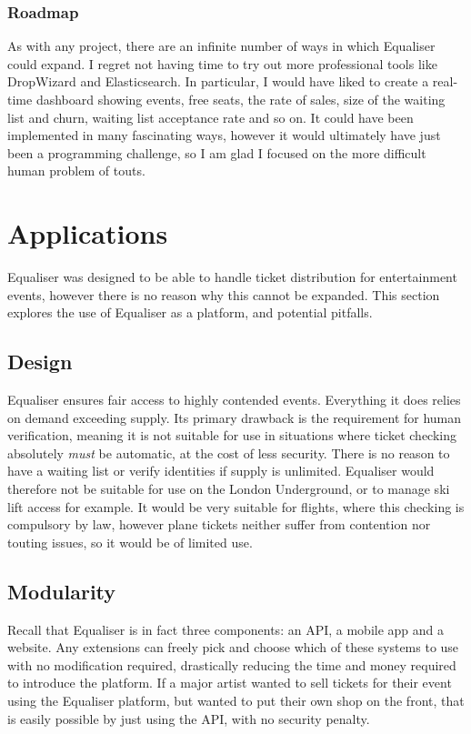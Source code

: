 \documentclass[12pt,a4paper]{bhamdissertation}
\begin{document}
\subsection{Roadmap}

As with any project, there are an infinite number of ways in which Equaliser could expand. I regret not having time to try out more professional tools like DropWizard and Elasticsearch. In particular, I would have liked to create a real-time dashboard showing events, free seats, the rate of sales, size of the waiting list and churn, waiting list acceptance rate and so on. It could have been implemented in many fascinating ways, however it would ultimately have just been a programming challenge, so I am glad I focused on the more difficult human problem of touts.

\chapter{Applications} \label{applications}

Equaliser was designed to be able to handle ticket distribution for entertainment events, however there is no reason why this cannot be expanded. This section explores the use of Equaliser as a platform, and potential pitfalls.

\section{Design}

Equaliser ensures fair access to highly contended events. Everything it does relies on demand exceeding supply. Its primary drawback is the requirement for human verification, meaning it is not suitable for use in situations where ticket checking absolutely \textit{must} be automatic, at the cost of less security. There is no reason to have a waiting list or verify identities if supply is unlimited. Equaliser would therefore not be suitable for use on the London Underground, or to manage ski lift access for example. It would be very suitable for flights, where this checking is compulsory by law, however plane tickets neither suffer from contention nor touting issues, so it would be of limited use.

\section{Modularity}

Recall that Equaliser is in fact three components: an API, a mobile app and a website. Any extensions can freely pick and choose which of these systems to use with no modification required, drastically reducing the time and money required to introduce the platform. If a major artist wanted to sell tickets for their event using the Equaliser platform, but wanted to put their own shop on the front, that is easily possible by just using the API, with no security penalty.
\end{document}
